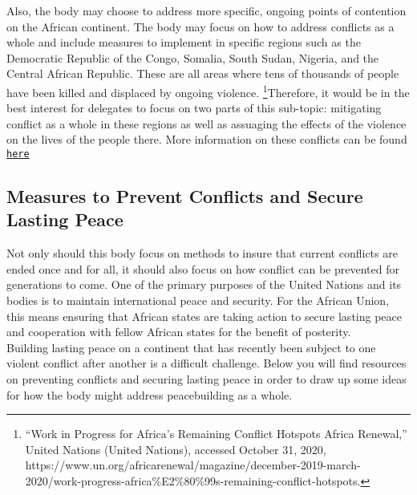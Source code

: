 \documentclass[10pt, letterpaper]{article}
\begin{document}
Also, the body may choose to address more specific, ongoing points of
contention on the African continent. The body may focus on how to
address conflicts as a whole and include measures to implement in
specific regions such as the Democratic Republic of the Congo, Somalia,
South Sudan, Nigeria, and the Central African Republic. These are all
areas where tens of thousands of people have been killed and displaced
by ongoing violence. \footnote{``Work in Progress for Africa's Remaining
  Conflict Hotspots \textbar{} Africa Renewal,'' United Nations (United
  Nations), accessed October 31, 2020,
  https://www.un.org/africarenewal/magazine/december-2019-march-2020/work-progress-africa\%E2\%80\%99s-remaining-conflict-hotspots.}Therefore,
it would be in the best interest for delegates to focus on two parts of
this sub-topic: mitigating conflict as a whole in these regions as well
as assuaging the effects of the violence on the lives of the people
there. More information on these conflicts can be found \texttt{\href{https://www.un.org/africarenewal/magazine/december-2019-march-2020/work-progress-africa\%E2\%80\%99s-remaining-conflict-hotspots\#:~:text=In\%20its\%20quest\%20to\%20\%E2\%80\%9CSilence,Libya\%2C\%20where\%20tens\%20of\%20thousands}{here}}
 \\

\subsection{Measures to Prevent Conflicts and Secure Lasting Peace}

Not only should this body focus on methods to insure that current
conflicts are ended once and for all, it should also focus on how
conflict can be prevented for generations to come. One of the primary
purposes of the United Nations and its bodies is to maintain
international peace and security. For the African Union, this means
ensuring that African states are taking action to secure lasting peace
and cooperation with fellow African states for the benefit of posterity. \\

Building lasting peace on a continent that has recently been subject to
one violent conflict after another is a difficult challenge. Below you
will find resources on preventing conflicts and securing lasting peace
in order to draw up some ideas for how the body might address
peacebuilding as a whole. \\
\end{document}
